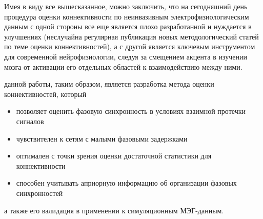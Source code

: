 
Имея в виду все вышесказанное, можно заключить, что на сегодняшний день
процедура оценки коннективности по неинвазивным электрофизиологическим данным с одной стороны
все еще является плохо разработанной и нуждается в улучшениях (неслучайна
регулярная публикация новых методологический статей по теме оценки коннективностей),
а с другой является ключевым инструментом для современной нейрофизиологии,
следуя за смещением акцента в изучении мозга от активации его отдельных областей к взаимодействию 
между ними.

{\aim} данной работы, таким образом, является разработка метода
оценки коннективностей, который
\begin{itemize}
        \item позволяет оценить фазовую синхронность в условиях взаимной протечки сигналов
        \item чувствителен к сетям с малыми фазовыми задержками
        \item оптимален с точки зрения оценки достаточной статистики для коннективности
        \item способен учитывать априорную информацию об организации фазовых синхронностей
\end{itemize}
а также его валидация в применении к симуляционным МЭГ-данным.

